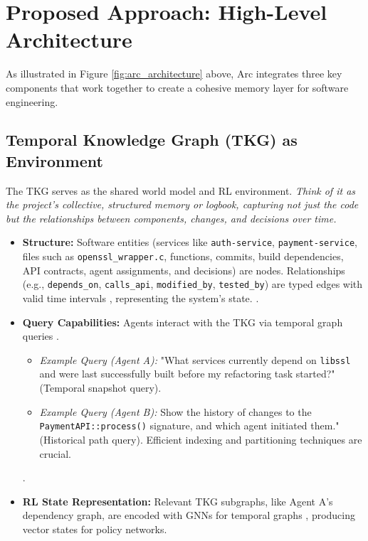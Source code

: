 \documentclass{article}
\begin{document}
\section{Proposed Approach: High-Level Architecture}
As illustrated in Figure \ref{fig:arc_architecture} above, Arc integrates three key components that work together to create a cohesive memory layer for software engineering.

\subsection{Temporal Knowledge Graph (TKG) as Environment}
The TKG serves as the shared world model and RL environment. \textit{Think of it as the project's collective, structured memory or logbook, capturing not just the code but the relationships between components, changes, and decisions over time.}
\begin{itemize}
  \item \textbf{Structure:} Software entities (services like \verb|auth-service|, \verb|payment-service|, files such as \verb|openssl_wrapper.c|, functions, commits, build dependencies, API contracts, agent assignments, and decisions) are nodes. Relationships (e.g., \verb|depends_on|, \verb|calls_api|, \verb|modified_by|, \verb|tested_by|) are typed edges with valid time intervals \cite{ref8}, representing the system's state. \cite{ref23}.
  \item \textbf{Query Capabilities:} Agents interact with the TKG via temporal graph queries \cite{ref_zep_lc}.
\begin{itemize}
    \item \textit{Example Query (Agent A):} "What services currently depend on \verb|libssl| and were last successfully built before my refactoring task started?" (Temporal snapshot query).
    \item \textit{Example Query (Agent B):} Show the history of changes to the \verb|PaymentAPI::process()| signature, and which agent initiated them." (Historical path query). Efficient indexing and partitioning techniques are crucial.
\end{itemize}
 \cite{ref24,ref32,ref33}.
  \item \textbf{RL State Representation:} Relevant TKG subgraphs, like Agent A's dependency graph, are encoded with GNNs for temporal graphs \cite{ref15,ref23,ref28,ref36}, producing vector states for policy networks.
\end{itemize}
\end{document}
